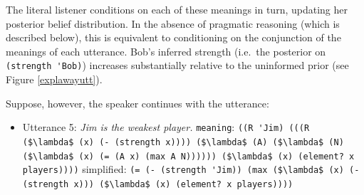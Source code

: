 \documentclass[pdfextras]{handbook}
\newcommand{\llbracket}{\ensuremath{\left [\!\left [}}%
\newcommand{\rrbracket}{\ensuremath{\right ]\!\right ]}}
\providecommand{\sv}[1]{\ensuremath{\llbracket \mathit{#1} \rrbracket}}
\begin{document}
The literal listener conditions on each of these meanings in turn, updating her posterior belief distribution.
In the absence of pragmatic reasoning (which is described below), this is equivalent to conditioning on the conjunction of the meanings of each utterance.  
Bob's inferred strength (i.e.~the posterior on \lstinline{(strength 'Bob)}) increases substantially relative to the uninformed prior (see Figure \ref{explawayutt}). 

Suppose, however, the speaker continues with the utterance:
\begin{itemize}
\item Utterance 5: \emph{Jim is the weakest player.}
\subitem \lstinline{meaning}:  \lstinline[mathescape]{((R 'Jim) (((R ($\lambda$ (x) (- (strength x)))) ($\lambda$ (A) ($\lambda$ (N) ($\lambda$ (x) (= (A x) (max A N)))))) ($\lambda$ (x) (element? x players))))}
\subitem simplified: \lstinline[mathescape]{(= (- (strength 'Jim)) (max ($\lambda$ (x) (- (strength x))) ($\lambda$ (x) (element? x players))))}
\end{itemize}
%
\end{document}
